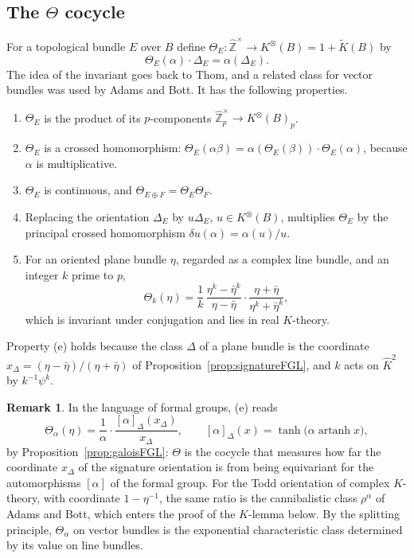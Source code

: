 \documentclass[11pt]{amsart}
\theoremstyle{plain}
\theoremstyle{definition}
\newtheorem{remark}[theorem]{Remark}
\numberwithin{equation}{section}
\newcommand{\Zhat}{\widehat{\mathbb{Z}}}
\newcommand{\units}{^{\times}}
\begin{document}
\subsection{The $\Theta$ cocycle}
For a topological bundle $E$ over $B$ define $\Theta_E\colon\Zhat\units\to K^\otimes(B)=1+\widetilde K(B)$ by
\[
\Theta_E(\alpha)\cdot\Delta_E=\alpha(\Delta_E).
\]
The idea of the invariant goes back to Thom, and a related class for vector bundles was used by Adams and Bott.
It has the following properties.
\begin{enumerate}[label=(\alph*)]
\item $\Theta_E$ is the product of its $p$-components $\Zhat_p\units\to K^\otimes(B)_p$.
\item $\Theta_E$ is a crossed homomorphism: $\Theta_E(\alpha\beta)=\alpha(\Theta_E(\beta))\cdot\Theta_E(\alpha)$, because $\alpha$ is multiplicative.
\item $\Theta_E$ is continuous, and $\Theta_{E\oplus F}=\Theta_E\Theta_F$.
\item Replacing the orientation $\Delta_E$ by $u\Delta_E$, $u\in K^\otimes(B)$, multiplies $\Theta_E$ by the principal crossed homomorphism $\delta u(\alpha)=\alpha(u)/u$.
\item For an oriented plane bundle $\eta$, regarded as a complex line bundle, and an integer $k$ prime to $p$,
\[
\Theta_k(\eta)=\frac1k\,\frac{\eta^k-\bar\eta^k}{\eta-\bar\eta}\cdot\frac{\eta+\bar\eta}{\eta^k+\bar\eta^k},
\]
which is invariant under conjugation and lies in real $K$-theory.
\end{enumerate}
Property (e) holds because the class $\Delta$ of a plane bundle is the coordinate $x_\Delta=(\eta-\bar\eta)/(\eta+\bar\eta)$ of Proposition~\ref{prop:signatureFGL}, and $k$ acts on $\widehat K^2$ by $k^{-1}\psi^k$.

\begin{remark}\label{rem:Thetacoordinate}
In the language of formal groups, (e) reads
\[
\Theta_\alpha(\eta)=\frac{1}{\alpha}\cdot\frac{[\alpha]_\Delta(x_\Delta)}{x_\Delta},\qquad [\alpha]_\Delta(x)=\tanh\bigl(\alpha\operatorname{artanh}x\bigr),
\]
by Proposition~\ref{prop:galoisFGL}: $\Theta$ is the cocycle that measures how far the coordinate $x_\Delta$ of the signature orientation is from being equivariant for the automorphisms $[\alpha]$ of the formal group.
For the Todd orientation of complex $K$-theory, with coordinate $1-\eta^{-1}$, the same ratio is the cannibalistic class $\rho^\alpha$ of Adams and Bott, which enters the proof of the $K$-lemma below.
By the splitting principle, $\Theta_\alpha$ on vector bundles is the exponential characteristic class determined by its value on line bundles.
\end{remark}
\end{document}
